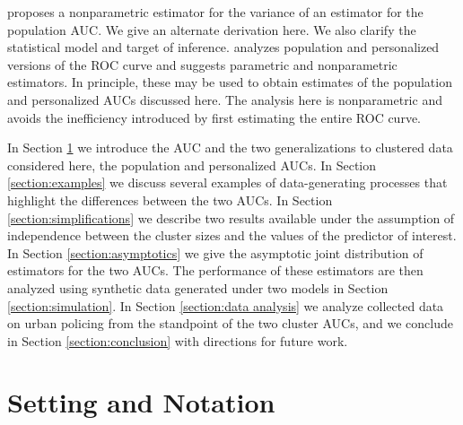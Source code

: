 \documentclass[12pt]{article}
\newcommand{\comment}[1]{
  \iftoggle{commenttoggle}{
    {\normalsize{\color{red}{ #1}}\normalsize}
  }
  {}
}
\begin{document}
\cite{obuchowski1997} proposes a nonparametric estimator for the
variance of an estimator for the population AUC. We give an alternate
derivation here. We also clarify the statistical model and target of
inference. \cite{michael2019} analyzes population and personalized
versions of the ROC curve and suggests parametric and nonparametric
estimators. In principle, these may be used to obtain estimates of the
population and personalized AUCs discussed here. The analysis here is
nonparametric and avoids the inefficiency introduced by first estimating the entire ROC curve.%

In Section \ref{section:setting} we introduce the AUC
and the two generalizations to clustered data considered here, the
population and personalized AUCs. In Section \ref{section:examples} we
discuss several examples of data-generating processes that highlight
the differences between the two AUCs. In Section
\ref{section:simplifications} we describe two results available under
the assumption of independence between the cluster sizes and the
values of the predictor of interest. In Section \ref{section:asymptotics} we
give the asymptotic joint distribution of estimators for the two AUCs. The performance of these estimators are then
analyzed using synthetic data generated under two models in Section
\ref{section:simulation}. In Section \ref{section:data analysis} we
analyze collected data on urban policing from the standpoint of the
two cluster AUCs, and we conclude in Section \ref{section:conclusion}
with directions for future work.


\section{Setting and Notation}\label{section:setting}
\end{document}
